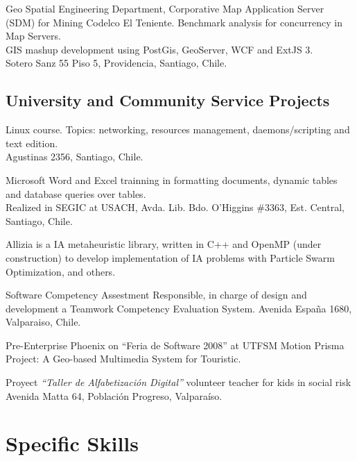 \documentclass[11pt,letterpaper,roman]{moderncv}
\begin{document}
	 {\intership} {\ikom} {\stgo} {}
	{Geo Spatial Engineering Department, Corporative Map Application Server
	(SDM) for  Mining Codelco El Teniente.  Benchmark analysis for concurrency in
	Map Servers. \\
	GIS mashup development using PostGis, GeoServer, WCF and ExtJS 3. 
	\\ Sotero Sanz
	55 Piso 5, Providencia, Santiago, Chile.}

\subsection{University and Community Service Projects}

	 {\tchr} {\ipgamma} {\stgo} {}
	{\sence Linux course. Topics: networking, resources management,
	daemons/scripting and text edition.\\ Agustinas 2356, Santiago, Chile.}

	 {\tchr} {\otecnewline} {\stgo} {}
	{\sence Microsoft Word and Excel trainning in formatting documents,
	dynamic tables and database queries over tables. \\
	Realized in SEGIC at USACH, Avda. Lib. Bdo. O'Higgins \#3363, Est.
	Central, Santiago, Chile.}

	
	{Allizia is a IA metaheuristic library, written in C++ and OpenMP (under
	construction) to develop implementation of IA problems with Particle Swarm Optimization, and others.}

	 { } {} {}
	{Software Competency Assestment Responsible, in charge of design
	and development a Teamwork Competency Evaluation System. Avenida Espa\~na 1680,
	Valparaiso, Chile.}

	 {\sd} { } {} {}
	{Pre-Enterprise Phoenix on ``Feria de Software 2008'' at \textsc{UTFSM}
	Motion Prisma Project: A Geo-based Multimedia System for Touristic.}

	 {\tchr} {\ernestoquiroz } {\valpo} {}
	{Proyect \textit{``Taller de Alfabetizaci\'on Digital''} volunteer
	teacher for kids in social risk Avenida Matta 64, Poblaci\'on Progreso,
	Valpara\'iso.}
	
\section{Specific Skills}
\end{document}
